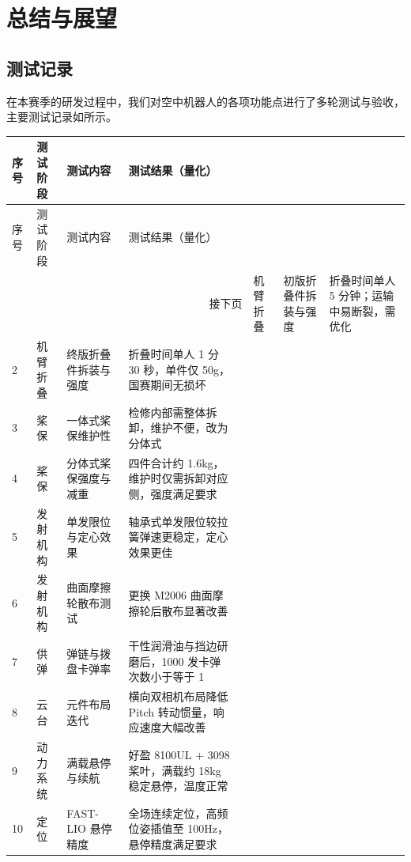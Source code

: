 \chapter{总结与展望}


\section{测试记录}

在本赛季的研发过程中，我们对空中机器人的各项功能点进行了多轮测试与验收，主要测试记录如所示。

\begin{longtable}[htbp!]{ m{1cm}<{\centering}  m{1.6cm}<{\centering}  m{2.3cm}<{\centering}  m{4.9cm}<{\centering}  m{5.6cm}<{\centering} }
\hline
序号 & 测试阶段 & 测试内容 & 测试结果（量化） \\
\hline
\endfirsthead
\hline
序号 & 测试阶段 & 测试内容 & 测试结果（量化） \\
\hline
\endhead
\hline
\multicolumn{5}{r}{接下页}
\endfoot
\caption{空中机器人整机测试记录}
\label{tab:整机测试记录}
\endlastfoot
 \hline
 1 & 机臂折叠 & 初版折叠件拆装与强度 & 折叠时间单人 5 分钟；运输中易断裂，需优化 \\
 \hline
 2 & 机臂折叠 & 终版折叠件拆装与强度 & 折叠时间单人 1 分 30 秒，单件仅 50g，国赛期间无损坏 \\
 \hline
 3 & 桨保 & 一体式桨保维护性 & 检修内部需整体拆卸，维护不便，改为分体式 \\
 \hline
 4 & 桨保 & 分体式桨保强度与减重 & 四件合计约 1.6kg，维护时仅需拆卸对应侧，强度满足要求 \\
 \hline
 5 & 发射机构 & 单发限位与定心效果 & 轴承式单发限位较拉簧弹速更稳定，定心效果更佳 \\
 \hline
 6 & 发射机构 & 曲面摩擦轮散布测试 & 更换 M2006 曲面摩擦轮后散布显著改善 \\
 \hline
 7 & 供弹 & 弹链与拨盘卡弹率 & 干性润滑油与挡边研磨后，1000 发卡弹次数小于等于 1 \\
 \hline
 8 & 云台 & 元件布局迭代 & 横向双相机布局降低 Pitch 转动惯量，响应速度大幅改善 \\
 \hline
 9 & 动力系统 & 满载悬停与续航 & 好盈 8100UL + 3098 桨叶，满载约 18kg 稳定悬停，温度正常 \\
 \hline
 10 & 定位 & FAST-LIO 悬停精度 & 全场连续定位，高频位姿插值至 100Hz，悬停精度满足要求 \\
 \hline
\end{longtable}

